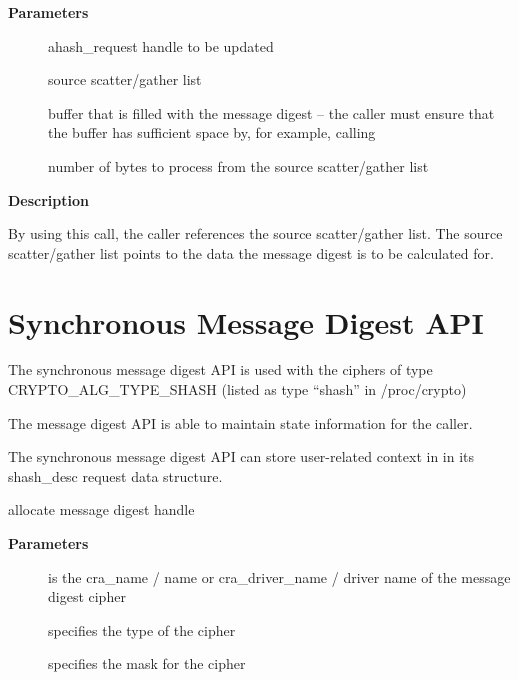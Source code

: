 \documentclass[a4paper,8pt,english]{sphinxmanual}
\begin{document}
\textbf{Parameters}
\begin{description}
\item[{}] \leavevmode
ahash\_request handle to be updated

\item[{}] \leavevmode
source scatter/gather list

\item[{}] \leavevmode
buffer that is filled with the message digest -- the caller must
ensure that the buffer has sufficient space by, for example, calling
{\hyperref[crypto/api\string-digest:c.crypto_ahash_digestsize]{\emph{}}}

\item[{}] \leavevmode
number of bytes to process from the source scatter/gather list

\end{description}

\textbf{Description}

By using this call, the caller references the source scatter/gather list.
The source scatter/gather list points to the data the message digest is to
be calculated for.


\section{Synchronous Message Digest API}
\label{crypto/api-digest:synchronous-message-digest-api}
The synchronous message digest API is used with the ciphers of type
CRYPTO\_ALG\_TYPE\_SHASH (listed as type ``shash'' in /proc/crypto)

The message digest API is able to maintain state information for the
caller.

The synchronous message digest API can store user-related context in in its
shash\_desc request data structure.

\begin{fulllineitems}
\label{crypto/api-digest:c.crypto_alloc_shash}
allocate message digest handle

\end{fulllineitems}


\textbf{Parameters}
\begin{description}
\item[{}] \leavevmode
is the cra\_name / name or cra\_driver\_name / driver name of the
message digest cipher

\item[{}] \leavevmode
specifies the type of the cipher

\item[{}] \leavevmode
specifies the mask for the cipher

\end{description}
\end{document}
